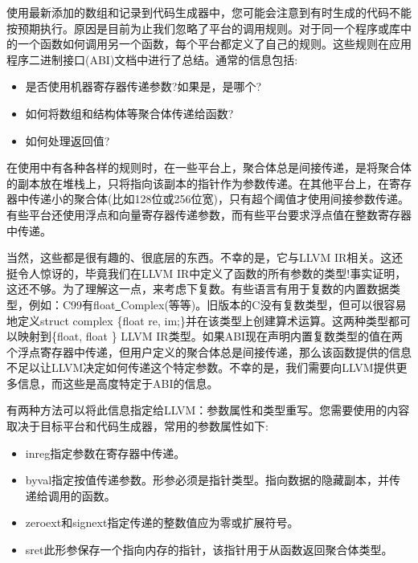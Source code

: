 
使用最新添加的数组和记录到代码生成器中，您可能会注意到有时生成的代码不能按预期执行。原因是目前为止我们忽略了平台的调用规则。对于同一个程序或库中的一个函数如何调用另一个函数，每个平台都定义了自己的规则。这些规则在应用程序二进制接口(ABI)文档中进行了总结。通常的信息包括:\par

\begin{itemize}
\item 是否使用机器寄存器传递参数?如果是，是哪个?
\item 如何将数组和结构体等聚合体传递给函数?
\item 如何处理返回值?
\end{itemize}

在使用中有各种各样的规则时，在一些平台上，聚合体总是间接传递，是将聚合体的副本放在堆栈上，只将指向该副本的指针作为参数传递。在其他平台上，在寄存器中传递小的聚合体(比如128位或256位宽)，只有超个阈值才使用间接参数传递。有些平台还使用浮点和向量寄存器传递参数，而有些平台要求浮点值在整数寄存器中传递。\par

当然，这些都是很有趣的、很底层的东西。不幸的是，它与LLVM IR相关。这还挺令人惊讶的，毕竟我们在LLVM IR中定义了函数的所有参数的类型!事实证明，这还不够。为了理解这一点，来考虑下复数。有些语言有用于复数的内置数据类型，例如：C99有float\underline{~}Complex(等等)。旧版本的C没有复数类型，但可以很容易地定义struct complex \{float re, im;\}并在该类型上创建算术运算。这两种类型都可以映射到\{float, float \} LLVM IR类型。如果ABI现在声明内置复数类型的值在两个浮点寄存器中传递，但用户定义的聚合体总是间接传递，那么该函数提供的信息不足以让LLVM决定如何传递这个特定参数。不幸的是，我们需要向LLVM提供更多信息，而这些是高度特定于ABI的信息。\par

有两种方法可以将此信息指定给LLVM：参数属性和类型重写。您需要使用的内容取决于目标平台和代码生成器，常用的参数属性如下:\par

\begin{itemize}
\item inreg指定参数在寄存器中传递。
\item byval指定按值传递参数。形参必须是指针类型。指向数据的隐藏副本，并传递给调用的函数。
\item zeroext和signext指定传递的整数值应为零或扩展符号。
\item sret此形参保存一个指向内存的指针，该指针用于从函数返回聚合体类型。
\end{itemize}

